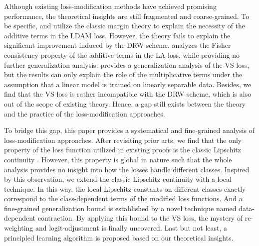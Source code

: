 Although existing loss-modification methods have achieved promising performance, the theoretical insights are still fragmented and coarse-grained. To be specific, \citet{DBLP:conf/nips/CaoWGAM19} and \citet{DBLP:conf/nips/RenYSMZYL20} utilize the classic margin theory to explain the necessity of the additive terms in the LDAM loss. However, the theory fails to explain the significant improvement induced by the DRW scheme. \citet{DBLP:conf/iclr/MenonJRJVK21} analyzes the Fisher consistency property \cite{10.5555/2371238} of the additive terms in the LA loss, while providing no further generalization analysis. \citet{DBLP:conf/nips/KiniPOT21} provides a generalization analysis of the VS loss, but the results can only explain the role of the multiplicative terms under the assumption that a linear model is trained on linearly separable data. Besides, we find that the VS loss is rather incompatible with the DRW scheme, which is also out of the scope of existing theory. Hence, a gap still exists between the theory and the practice of the loss-modification approaches.

To bridge this gap, this paper provides a systematical and fine-grained analysis of loss-modification approaches. After revisiting prior arts, we find that the only property of the loss function utilized in existing proofs is the classic Lipschitz continuity \cite{10.5555/2371238,ledoux1991probability}. However, this property is global in nature such that the whole analysis provides no insight into how the losses handle different classes. Inspired by this observation, we extend the classic Lipschitz continuity with a local technique. In this way, the local Lipschitz constants on different classes exactly correspond to the class-dependent terms of the modified loss functions. And a fine-grained generalization bound is established by a novel technique named data-dependent contraction. By applying this bound to the VS loss, the mystery of re-weighting and logit-adjustment is finally uncovered. Last but not least, a principled learning algorithm is proposed based on our theoretical insights. 

